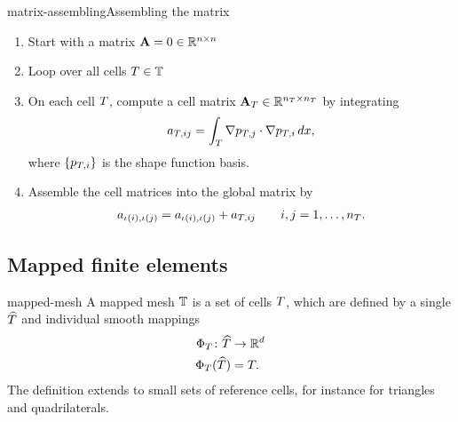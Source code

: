 \begin{Algorithm*}{matrix-assembling}{Assembling the matrix}
  \begin{enumerate}
  \item Start with a matrix $\mathbf A = 0 \in \mathbb R^{n\times n}$
  \item Loop over all cells $T\in\mathbb T$
  \item On each cell $T$, compute a cell matrix
    $\mathbf A_T \in \mathbb R^{n_T\times n_T}$ by integrating
    \begin{gather}
      a_{T,ij} = \int_T \nabla p_{T,j}\cdot\nabla p_{T,i}\,dx,
    \end{gather}
    where $\{p_{T,i}\}$ is the shape function basis.
  \item Assemble the cell matrices into the global matrix by
    \begin{gather}
      a_{\iota(i),\iota(j)} = a_{\iota(i),\iota(j)} + a_{T,ij}
      \qquad i,j = 1,\dots,n_T.
    \end{gather}
  \end{enumerate}
\end{Algorithm*}

\subsection{Mapped finite elements}

\begin{Definition}{mapped-mesh}
  A mapped mesh $\mathbb T$ is a set of cells $T$, which are defined
  by a single  $\widehat {T}$ and individual
  smooth mappings
  \begin{gather}
    \begin{split}
      \Phi_T \colon \widehat {T} &\to \mathbb R^d\\
      \Phi_T(\widehat {T}) &= T.
    \end{split}
  \end{gather}
  The definition extends to small sets of reference cells, for
  instance for triangles and quadrilaterals.
\end{Definition}

